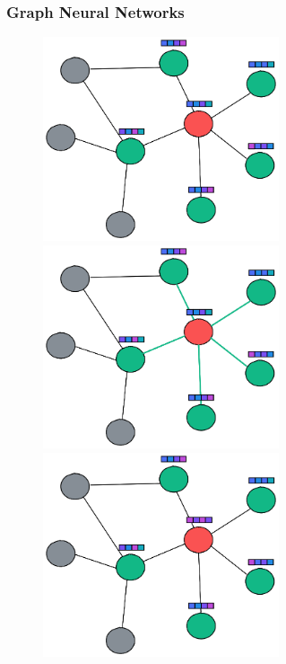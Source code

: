 \documentclass[aspectratio=169]{beamer}
\begin{document}
\begin{frame}[t]
    \frametitle{Graph Neural Networks}
    \begin{center}
        \begin{figure}
            \begin{overprint}
                \centering \includegraphics[width=7cm, height=6cm]{img/gnn_1.png}
                \centering \includegraphics[width=7cm, height=6cm]{img/gnn_2.png}
                \centering \includegraphics[width=7cm, height=6cm]{img/gnn_3.png}
            \end{overprint}
        \end{figure}
    \end{center}
\end{frame}
\end{document}

